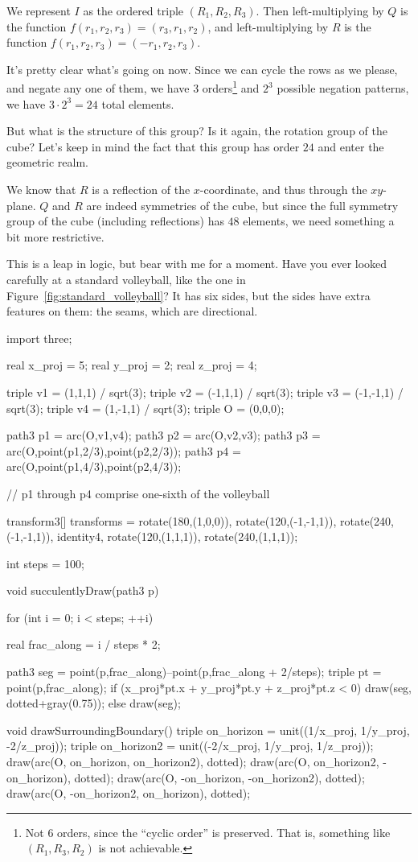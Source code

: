 \documentclass[../key.tex]{subfiles}
\begin{document}
We represent $I$ as the ordered triple $(R_1,R_2,R_3)$. Then left-multiplying by $Q$ is the function $f(r_1,r_2,r_3)=(r_3,r_1,r_2)$, and left-multiplying by $R$ is the function $f(r_1,r_2,r_3)=(-r_1,r_2,r_3)$.

It's pretty clear what's going on now. Since we can cycle the rows as we please, and negate any one of them, we have $3$ orders\footnote{Not $6$ orders, since the ``cyclic order'' is preserved. That is, something like $(R_1,R_3,R_2)$ is not achievable.} and $2^3$ possible negation patterns, we have $3\cdot 2^3 = 24$ total elements.

But what is the structure of this group? Is it again, the rotation group of the cube? Let's keep in mind the fact that this group has order $24$ and enter the geometric realm.

We know that $R$ is a reflection of the $x$-coordinate, and thus through the $xy$-plane. $Q$ and $R$ are indeed symmetries of the cube, but since the full symmetry group of the cube (including reflections) has $48$ elements, we need something a bit more restrictive.

This is a leap in logic, but bear with me for a moment. Have you ever looked carefully at a standard volleyball, like the one in Figure~\ref{fig:standard_volleyball}? It has six sides, but the sides have extra features on them: the seams, which are directional.

\begin{asydef}
	import three;

	real x_proj = 5;
	real y_proj = 2;
	real z_proj = 4;

	triple v1 = (1,1,1) / sqrt(3);
	triple v2 = (-1,1,1) / sqrt(3);
	triple v3 = (-1,-1,1) / sqrt(3);
	triple v4 = (1,-1,1) / sqrt(3);
	triple O = (0,0,0);

	path3 p1 = arc(O,v1,v4);
	path3 p2 = arc(O,v2,v3);
	path3 p3 = arc(O,point(p1,2/3),point(p2,2/3));
	path3 p4 = arc(O,point(p1,4/3),point(p2,4/3));

	// p1 through p4 comprise one-sixth of the volleyball

	transform3[] transforms = {
		rotate(180,(1,0,0)),
		rotate(120,(-1,-1,1)),
		rotate(240,(-1,-1,1)),
		identity4,
		rotate(120,(1,1,1)),
		rotate(240,(1,1,1))};

	int steps = 100;

	void succulentlyDraw(path3 p) {
		for (int i = 0; i < steps; ++i) {
			real frac_along = i / steps * 2;

			path3 seg = point(p,frac_along)--point(p,frac_along + 2/steps);
			triple pt = point(p,frac_along);
			if (x_proj*pt.x + y_proj*pt.y + z_proj*pt.z < 0) {
				draw(seg, dotted+gray(0.75));
			} else {
				draw(seg);
			}
		}
	}

	void drawSurroundingBoundary() {
		triple on_horizon = unit((1/x_proj, 1/y_proj, -2/z_proj));
		triple on_horizon2 = unit((-2/x_proj, 1/y_proj, 1/z_proj));
		draw(arc(O, on_horizon, on_horizon2), dotted);
		draw(arc(O, on_horizon2, -on_horizon), dotted);
		draw(arc(O, -on_horizon, -on_horizon2), dotted);
		draw(arc(O, -on_horizon2, on_horizon), dotted);
	}
\end{asydef}
\end{document}
